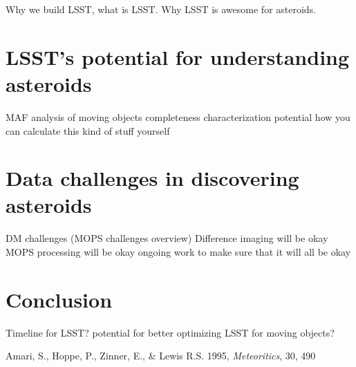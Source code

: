 \documentclass{iau}
\begin{document}
Why we build LSST, what is LSST. Why LSST is awesome for asteroids.

\section{LSST's potential for understanding asteroids}

MAF analysis of moving objects
completeness
characterization potential
how you can calculate this kind of stuff yourself


\section{Data challenges in discovering asteroids}

DM challenges (MOPS challenges overview)
Difference imaging will be okay
MOPS processing will be okay
ongoing work to make sure that it will all be okay

\section{Conclusion}

Timeline for LSST?
potential for better optimizing LSST for moving objects? 


\begin{thebibliography}{}

{Amari, S., Hoppe, P., Zinner, E., \& Lewis R.S.} 1995,
\textit{Meteoritics}, 30, 490 

\end{thebibliography}

\end{document}
